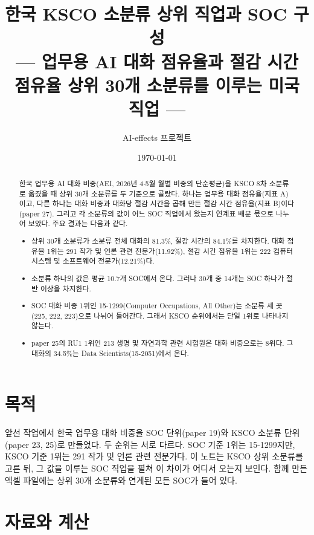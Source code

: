 \documentclass[11pt]{article}
\title{한국 KSCO 소분류 상위 직업과 SOC 구성\\[2mm]
\large --- 업무용 AI 대화 점유율과 절감 시간 점유율 상위 30개 소분류를 이루는 미국 직업 ---}
\author{AI-effects 프로젝트}
\date{\today}
\begin{document}
\maketitle

\begin{abstract}
\noindent 한국 업무용 AI 대화 비중(AEI, 2026년 4$\cdot$5월 월별 비중의 단순평균)을 KSCO 8차 소분류로 옮겼을 때 상위 30개 소분류를 두 기준으로 골랐다. 하나는 업무용 대화 점유율(지표 A)이고, 다른 하나는 대화 비중과 대화당 절감 시간을 곱해 만든 절감 시간 점유율(지표 B)이다(paper 27). 그리고 각 소분류의 값이 어느 SOC 직업에서 왔는지 연계표 배분 몫으로 나누어 보았다. 주요 결과는 다음과 같다.
\begin{itemize}[leftmargin=*]
  \item 상위 30개 소분류가 소분류 전체 대화의 81.3\%, 절감 시간의 84.1\%를 차지한다. 대화 점유율 1위는 291 작가 및 언론 관련 전문가(11.92\%), 절감 시간 점유율 1위는 222 컴퓨터 시스템 및 소프트웨어 전문가(12.21\%)다.
  \item 소분류 하나의 값은 평균 10.7개 SOC에서 온다. 그러나 30개 중 14개는 SOC 하나가 절반 이상을 차지한다.
  \item SOC 대화 비중 1위인 15-1299(Computer Occupations, All Other)는 소분류 세 곳(225, 222, 223)으로 나뉘어 들어간다. 그래서 KSCO 순위에서는 단일 1위로 나타나지 않는다.
  \item paper 25의 RU1 1위인 213 생명 및 자연과학 관련 시험원은 대화 비중으로는 8위다. 그 대화의 34.5\%는 Data Scientists(15-2051)에서 온다.
\end{itemize}
\end{abstract}

\section{목적}

앞선 작업에서 한국 업무용 대화 비중을 SOC 단위(paper 19)와 KSCO 소분류 단위(paper 23, 25)로 만들었다. 두 순위는 서로 다르다. SOC 기준 1위는 15-1299지만, KSCO 기준 1위는 291 작가 및 언론 관련 전문가다. 이 노트는 KSCO 상위 소분류를 고른 뒤, 그 값을 이루는 SOC 직업을 펼쳐 이 차이가 어디서 오는지 보인다. 함께 만든 엑셀 파일에는 상위 30개 소분류와 연계된 모든 SOC가 들어 있다.

\section{자료와 계산}
\end{document}
